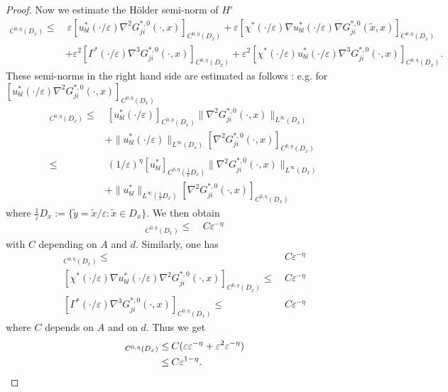 \documentclass[11pt, reqno]{amsart}
\theoremstyle{definition}
\theoremstyle{remark}
\numberwithin{equation}{section}
\begin{document}
\begin{proof}[Proof]
		\noindent Now we estimate the H\"older semi-norm	of $H^\varepsilon$
		\begin{align*}		
			[H^\varepsilon]_{C^{0,\eta}(D_x)}	\leq &\: \varepsilon  [ u_{bl}^{*}(\cdot /\varepsilon)\nabla^2 G_{ji}^{*,0}  (\cdot,x) ]_{C^{0,\eta}(D_x)} +   \varepsilon [ \chi^{*}(\cdot/\varepsilon)\nabla u_{bl}^{*}	(\cdot/\varepsilon)\nabla G_{ji}^{*,0}  (\tilde{x},x) ]_{C^{0,\eta}(D_x)}\\
			& +  \varepsilon^2 [\Gamma^*(\cdot/\varepsilon) \nabla^3 G_{ji}^{*,0}  (\cdot,x) ]_{C^{0,\eta}(D_x)} + \varepsilon^2 [\chi^*(\cdot/\varepsilon)u_{bl}^*(\cdot/\varepsilon) \nabla^3 G_{ji}^{*,0} (\cdot,x) ]_{C^{0,\eta}(D_x)} .
		\end{align*}
		These semi-norms in the right hand side are estimated as follows : e.g. for $ [ u_{bl}^{*}(\cdot /\varepsilon)\nabla^2 G_{ji}^{*,0}  (\cdot,x) ]_{C^{0,\eta}(D_x)}$
		\begin{align*}		
			[ u_{bl}^{*}(\cdot /\varepsilon)\nabla^2 G_{ji}^{*,0}  (\cdot,x) ]_{C^{0,\eta}(D_x)} \leq& \: [ u_{bl}^{*}(\cdot /\varepsilon) ]_{C^{0,\eta}(D_x)} \| \nabla^2 G_{ji}^{*,0}  (\cdot,x)\|_{L^\infty(D_x)}\\&+ \|u_{bl}^{*}(\cdot /\varepsilon)\|_{L^\infty(D_x)}  [ \nabla^2 G_{ji}^{*,0}  (\cdot,x) ]_{C^{0,\eta}(D_x)}\\
			\leq&\: (1/\varepsilon)^\eta[ u_{bl}^{*} ]_{C^{0,\eta}(\frac{1}{\varepsilon}D_x)} \| \nabla^2 G_{ji}^{*,0}  (\cdot,x)\|_{L^\infty(D_x)}\\&+ \|u_{bl}^{*}\|_{L^\infty(\frac{1}{\varepsilon}D_x)}  [ \nabla^2 G_{ji}^{*,0}  (\cdot,x) ]_{C^{0,\eta}(D_x)}
		\end{align*}
		where $\frac{1}{\varepsilon}D_x:=\{\tilde{y}= \tilde{x}/\varepsilon : \tilde{x}\in D_x\}$. We then obtain
		\begin{align*}		
			[ u_{bl}^{*}(\cdot /\varepsilon)\nabla^2 G_{ji}^{*,0}  (\cdot,x) ]_{C^{0,\eta}(D_x)} 
			\leq &\: C\varepsilon^{-\eta}
		\end{align*}
		with $C$ depending on $A$ and $d$.	 Similarly, one has
		\begin{align*}		
			[\chi^{*}(\cdot /\varepsilon)  u_{bl}^{*}(\cdot /\varepsilon)\nabla^3 G_{ji}^{*,0}  (\cdot,x) ]_{C^{0,\eta}(D_x)} 
			\leq &\: C\varepsilon^{-\eta}\\
			[ \chi^{*}(\cdot /\varepsilon) \nabla u_{bl}^{*}(\cdot /\varepsilon)\nabla^2 G_{ji}^{*,0}  (\cdot,x) ]_{C^{0,\eta}(D_x)} 
			\leq &\: C\varepsilon^{-\eta}\\
			[ \Gamma^{*}(\cdot /\varepsilon)\nabla^3 G_{ji}^{*,0}  (\cdot,x) ]_{C^{0,\eta}(D_x)} 
			\leq &\: C\varepsilon^{-\eta}
		\end{align*}
		where $C$ depends on $A$ and on $d$.
		Thus we get 
		\begin{align*}		
			[H^\varepsilon]_{C^{0,\eta}(D_x)} 
			\leq &\: C(\varepsilon\varepsilon^{-\eta} + \varepsilon^2 \varepsilon^{-\eta})\\
			\leq 	&\: C \varepsilon^{1-\eta}.\qedhere
		\end{align*}
	\end{proof}
	
\end{document}
